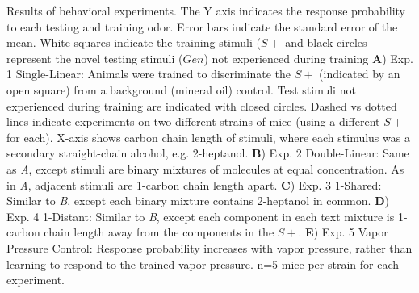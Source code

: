 \label{fig:results}
Results of behavioral experiments. The Y axis indicates the response probability to each testing and training odor. Error bars indicate the standard error of the mean. White squares indicate the training stimuli ($S+$ and black circles represent the novel testing stimuli ($Gen$) not experienced during training \textbf{A}) Exp. 1 Single-Linear: Animals were trained to discriminate the $S+$ (indicated by an open square) from a background (mineral oil) control.  Test stimuli not experienced during training are indicated with closed circles.  Dashed vs dotted lines indicate experiments on two different strains of mice (using a different $S+$ for each).  X-axis shows carbon chain length of stimuli, where each stimulus was a secondary straight-chain alcohol, e.g. 2-heptanol.  \textbf{B})  Exp. 2 Double-Linear: Same as \textit{A}, except stimuli are binary mixtures of molecules at equal concentration.  As in \textit{A}, adjacent stimuli are 1-carbon chain length apart. \textbf{C}) Exp. 3 1-Shared: Similar to \textit{B}, except each binary mixture contains 2-heptanol in common. \textbf{D})  Exp. 4 1-Distant: Similar to \textit{B}, except each component in each text mixture is 1-carbon chain length away from the components in the $S+$. \textbf{E}) Exp. 5 Vapor Pressure Control: Response probability increases with vapor pressure, rather than learning to respond to the trained vapor pressure.  n=5 mice per strain for each experiment.  